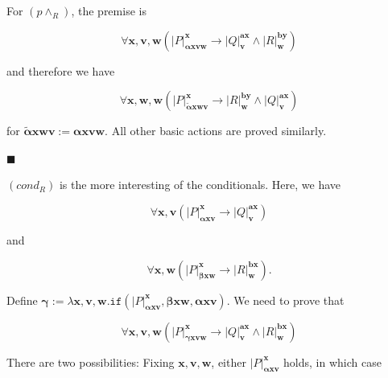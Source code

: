 For $(p\wedge_{R})$, the premise is\par
  
\par  \quad  \[\forall\bm{x},\bm{v},\bm{w}\left(|{P}|^{\bm{x}}_{\bm{\alpha}\bm{x}\bm{v}\bm{w}}\to|{Q}|^{\bm{a}\bm{x}}_{\bm{v}}\wedge|{R}|^{\bm{b}\bm{y}}_{\bm{w}}\right)\]\quad  \quad  
  
and therefore we have\par
  
\par  \quad  \[\forall\bm{x},\bm{w},\bm{w}\left(|{P}|^{\bm{x}}_{\tilde{\bm{\alpha}}\bm{x}\bm{w}\bm{v}}\to|{R}|^{\bm{b}\bm{y}}_{\bm{w}}\wedge|{Q}|^{\bm{a}\bm{x}}_{\bm{v}}\right)\]\quad  \quad  
  
for $\tilde{\bm{\alpha}}\bm{x}\bm{w}\bm{v}:=\bm{\alpha}\bm{x}\bm{v}\bm{w}$. All other basic actions are proved similarly.\par
 
 
 
\par\noindent  $\blacksquare$ 
 
$(cond_{R})$ is the more interesting of the conditionals. Here, we have\par
  
\par  \quad  \[\forall\bm{x},\bm{v}\left(|{P}|^{\bm{x}}_{\bm{\alpha}\bm{x}\bm{v}}\to|{Q}|^{\bm{a}\bm{x}}_{\bm{v}}\right)\]\quad  \quad  
  
and\par
  
\par  \quad  \[\forall\bm{x},\bm{w}\left(|{P}|^{\bm{x}}_{\bm{\beta}\bm{x}\bm{w}}\to|{R}|^{\bm{b}\bm{x}}_{\bm{w}}\right).\]\quad  \quad  
  
Define $\bm{\gamma}:=\lambda\bm{x},\bm{v},\bm{w}.\mathtt{if}({|{P}|^{\bm{x}}_{\bm{\alpha}\bm{x}\bm{v}}},{\bm{\beta}\bm{x}\bm{w}},{\bm{\alpha}\bm{x}\bm{v}})$. We need to prove that\par
  
\par  \quad  \[\forall\bm{x},\bm{v},\bm{w}\left(|{P}|^{\bm{x}}_{\bm{\gamma}\bm{x}\bm{v}\bm{w}}\to|{Q}|^{\bm{a}\bm{x}}_{\bm{v}}\wedge|{R}|^{\bm{b}\bm{x}}_{\bm{w}}\right)\]\quad  \quad  
  
There are two possibilities: Fixing $\bm{x},\bm{v},\bm{w}$, either $|{P}|^{\bm{x}}_{\bm{\alpha}\bm{x}\bm{v}}$ holds, in which case\par
  
